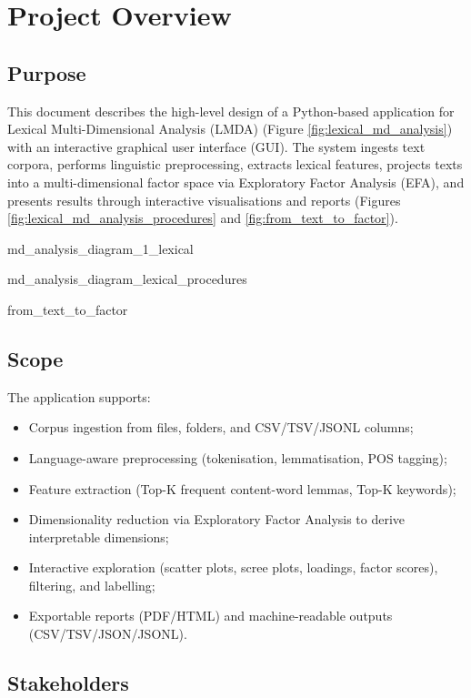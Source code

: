 \section{Project Overview}

\subsection{Purpose}

This document describes the high-level design of a Python-based application for Lexical Multi-Dimensional Analysis (LMDA) (Figure \ref{fig:lexical_md_analysis}) with an interactive graphical user interface (GUI). The system ingests text corpora, performs linguistic preprocessing, extracts lexical features, projects texts into a multi-dimensional factor space via Exploratory Factor Analysis (EFA), and presents results through interactive visualisations and reports (Figures \ref{fig:lexical_md_analysis_procedures} and \ref{fig:from_text_to_factor}).

{md_analysis_diagram_1_lexical}

{md_analysis_diagram_lexical_procedures}

{from_text_to_factor}

\subsection{Scope}

The application supports:

\begin{itemize}
    \item Corpus ingestion from files, folders, and CSV/TSV/JSONL columns;
    \item Language-aware preprocessing (tokenisation, lemmatisation, POS tagging);
    \item Feature extraction (Top-K frequent content-word lemmas, Top-K keywords);
    \item Dimensionality reduction via Exploratory Factor Analysis to derive interpretable dimensions;
    \item Interactive exploration (scatter plots, scree plots, loadings, factor scores), filtering, and labelling;
    \item Exportable reports (PDF/HTML) and machine-readable outputs (CSV/TSV/JSON/JSONL).
\end{itemize}

\subsection{Stakeholders}

